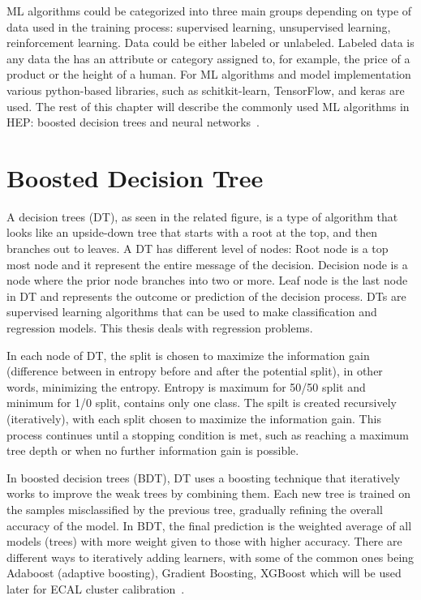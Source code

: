 ML algorithms could be categorized into three main groups depending on type of data used in the training process: supervised learning, unsupervised learning, reinforcement learning.%
Data could be either labeled or unlabeled.
Labeled data is any data the has an attribute or category assigned to, for example, the price of a product or the height of a human.
For ML algorithms and model implementation various python-based libraries, such as schitkit-learn, TensorFlow, and keras are used.
The rest of this chapter will describe the commonly used ML algorithms in HEP: boosted decision trees and neural networks~\cite{ML_models}.

\section{Boosted Decision Tree}
A decision trees (DT), as seen in the related figure, is a type of algorithm that looks like an upside-down tree that starts with a root at the top, and then branches out to leaves.
A DT has different level of nodes: Root node is a top most node and it represent the entire message of the decision.
Decision node is a node where the prior node branches into two or more.
Leaf node is the last node in DT and represents the outcome or prediction of the decision process.
DTs are supervised learning algorithms that can be used to make classification and regression models.
This thesis deals with regression problems.

In each node of DT, the split is chosen to maximize the information gain (difference between in entropy before and after the potential split), in other words, minimizing the entropy.
Entropy is maximum for 50/50 split and minimum for 1/0 split, \ie contains only one class.
The spilt is created recursively (iteratively), with each split chosen to maximize the information gain.
This process continues until a stopping condition is met, such as reaching a maximum tree depth or when no further information gain is possible.

In boosted decision trees (BDT), DT uses a boosting technique that iteratively works to improve the weak trees by combining them.
Each new tree is trained on the samples misclassified by the previous tree, gradually refining the overall accuracy of the model.
In BDT, the final prediction is the weighted average of all models (trees) with more weight given to those with higher accuracy.
There are different ways to iteratively adding learners,
with some of the common ones being Adaboost (adaptive boosting), Gradient Boosting, XGBoost which will be used later for ECAL cluster calibration~\cite{BDT}.

